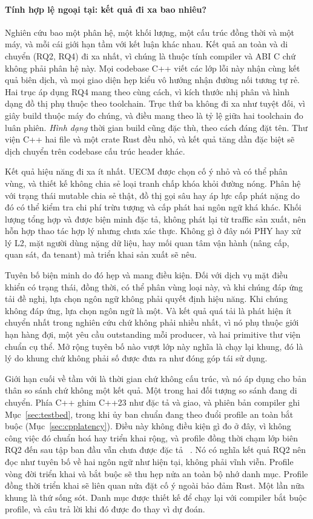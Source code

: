 \paragraph{Tính hợp lệ ngoại tại: kết quả đi xa bao nhiêu?}
Nghiên cứu bao một phân hệ, một khối lượng, một cấu trúc đồng thời và một máy, và
mỗi cái giới hạn tầm với kết luận khác nhau. Kết quả an toàn và di chuyển
(RQ2, RQ4) đi xa nhất, vì chúng là thuộc tính compiler và
ABI C chứ không phải phân hệ này. Mọi codebase C++ viết các lớp lỗi này nhận
cùng kết quả biên dịch, và mọi giao diện hẹp kiểu vô hướng nhận đường nối
tương tự rẻ. Hai trục áp dụng RQ4 mang theo cùng cách, vì kích thước nhị phân và hình dạng đồ thị phụ thuộc
theo toolchain. Trục thứ ba không đi xa như tuyệt đối, vì
giây build thuộc máy đo chúng, và điều mang theo là tỷ lệ
giữa hai toolchain đo luân phiên. \emph{Hình dạng} thời gian build cũng đặc thù, theo cách
đáng đặt tên. Thư viện C++ hai file và một crate Rust đều nhỏ, và kết quả
tăng dần đặc biệt sẽ dịch chuyển trên codebase cấu trúc header khác.

Kết quả hiệu năng
đi xa ít nhất. UECM được chọn cố ý nhỏ và
có thể phân vùng, và thiết kế không chia sẻ loại tranh chấp khóa khỏi đường nóng. Phân hệ với trạng thái mutable chia sẻ thật, đồ thị gọi sâu hay áp lực cấp phát nặng
do đó có thể kiểm tra chi phí trừu tượng và cấp phát hai ngôn ngữ khá khác. Khối lượng tổng hợp và được biện minh đặc tả, không phát lại từ traffic sản xuất, nên hỗn hợp thao tác
hợp lý nhưng chưa xác thực. Không gì ở đây nói PHY hay xử lý L2, mặt người dùng nặng dữ liệu, hay mối quan tâm vận hành (nâng cấp, quan sát, đa tenant) mà triển khai
sản xuất sẽ nêu.

Tuyên bố biện minh do đó hẹp và mang điều kiện. Đối với
dịch vụ mặt điều khiển có trạng thái, đồng thời, có thể phân vùng loại này, và khi chúng
đáp ứng tải đề nghị, lựa chọn ngôn ngữ không phải quyết định hiệu năng. Khi chúng không
đáp ứng, lựa chọn ngôn ngữ là một. Và kết quả quá tải là phát hiện ít chuyển
nhất trong nghiên cứu chứ không phải nhiều nhất, vì nó phụ thuộc giới hạn hàng đợi, một yêu cầu
outstanding mỗi producer, và hai primitive thư viện chuẩn cụ thể. Mở rộng
tuyên bố nào vượt lớp này nghĩa là chạy lại khung, đó là lý do khung chứ không phải
số được đưa ra như đóng góp tái sử dụng.

Giới hạn cuối về tầm với là thời gian chứ không cấu trúc, và nó áp dụng cho
bản thân so sánh chứ không một kết quả. Một trong hai đối tượng so sánh đang di chuyển. Phía C++
ghim C++23 như đặc tả và giao, và phiên bản compiler ghi Mục~\ref{sec:testbed}, trong khi ủy ban chuẩn đang theo đuổi profile an toàn
bắt buộc (Mục~\ref{sec:cpplatency}). Điều này không điều kiện gì đo ở đây, vì
không công việc đó chuẩn hoá hay triển khai rộng, và profile đồng thời
chạm lớp biên RQ2 đến sau tập ban đầu vẫn chưa được đặc tả
~\cite{vandevoorde2026profiles}. Nó có nghĩa kết quả RQ2 nên đọc như
tuyên bố về hai ngôn ngữ như hiện tại, không phải vĩnh viễn. Profile vòng đời
triển khai và bắt buộc sẽ thu hẹp nửa an toàn bộ nhớ danh mục. Profile
đồng thời triển khai sẽ liên quan nửa đặt cố ý ngoài bảo đảm Rust. Một lần nữa khung là thứ sống sót. Danh mục được thiết kế để chạy lại với
compiler bắt buộc profile, và câu trả lời khi đó được đo thay vì dự đoán.

